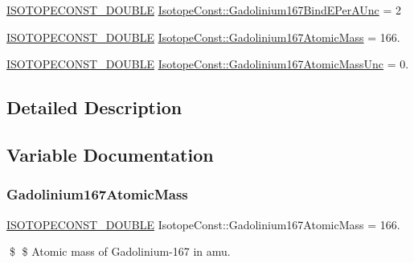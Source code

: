 \begin{DoxyCompactItemize}
\mbox{\hyperlink{group___isotope_const-_macros_ga8f45a7272ce02c0b4c65c44636ed719a}{I\+S\+O\+T\+O\+P\+E\+C\+O\+N\+S\+T\+\_\+\+D\+O\+U\+B\+LE}} \mbox{\hyperlink{group___isotope_const-_gadolinium-_gd167_ga3b70050425c9618ed0f01223c67e535e}{Isotope\+Const\+::\+Gadolinium167\+Bind\+E\+Per\+A\+Unc}} = 2
\item 
\mbox{\hyperlink{group___isotope_const-_macros_ga8f45a7272ce02c0b4c65c44636ed719a}{I\+S\+O\+T\+O\+P\+E\+C\+O\+N\+S\+T\+\_\+\+D\+O\+U\+B\+LE}} \mbox{\hyperlink{group___isotope_const-_gadolinium-_gd167_ga23313c7fe2a349673e9c27d1b72fe861}{Isotope\+Const\+::\+Gadolinium167\+Atomic\+Mass}} = 166.
\item 
\mbox{\hyperlink{group___isotope_const-_macros_ga8f45a7272ce02c0b4c65c44636ed719a}{I\+S\+O\+T\+O\+P\+E\+C\+O\+N\+S\+T\+\_\+\+D\+O\+U\+B\+LE}} \mbox{\hyperlink{group___isotope_const-_gadolinium-_gd167_gae3ea052b3941829014d2ce2cb9fd3729}{Isotope\+Const\+::\+Gadolinium167\+Atomic\+Mass\+Unc}} = 0.
\end{DoxyCompactItemize}


\subsection{Detailed Description}


\subsection{Variable Documentation}
\mbox{\label{group___isotope_const-_gadolinium-_gd167_ga23313c7fe2a349673e9c27d1b72fe861}} 
\subsubsection{\texorpdfstring{Gadolinium167\+Atomic\+Mass}{Gadolinium167AtomicMass}}
{\footnotesize\ttfamily \mbox{\hyperlink{group___isotope_const-_macros_ga8f45a7272ce02c0b4c65c44636ed719a}{I\+S\+O\+T\+O\+P\+E\+C\+O\+N\+S\+T\+\_\+\+D\+O\+U\+B\+LE}} Isotope\+Const\+::\+Gadolinium167\+Atomic\+Mass = 166.}

\$ \$ Atomic mass of Gadolinium-\/167 in amu. \mbox{\label{group___isotope_const-_gadolinium-_gd167_gae3ea052b3941829014d2ce2cb9fd3729}} 
